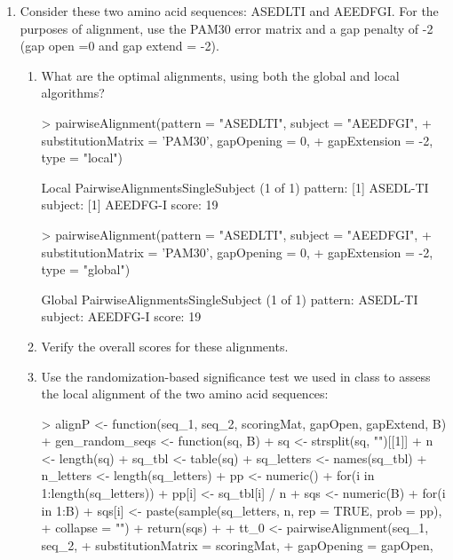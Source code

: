 \documentclass[12pt,a4paper]{paper}
\begin{document}
\begin{enumerate}
\begin{enumerate}
\end{enumerate}
\item Consider these two amino acid sequences: ASEDLTI and AEEDFGI. For the purposes of alignment, use the PAM30 error matrix and a gap penalty of -2 (gap open =0 and gap extend = -2).
\begin{enumerate}
\item What are the optimal alignments, using both the global and local algorithms?
\begin{Schunk}
\begin{Sinput}
> pairwiseAlignment(pattern = "ASEDLTI", subject = "AEEDFGI",
+                   substitutionMatrix = 'PAM30', gapOpening = 0, 
+                   gapExtension = -2, type = "local")
\end{Sinput}
\begin{Soutput}
Local PairwiseAlignmentsSingleSubject (1 of 1)
pattern: [1] ASEDL-TI
subject: [1] AEEDFG-I
score: 19 
\end{Soutput}
\begin{Sinput}
> pairwiseAlignment(pattern = "ASEDLTI", subject = "AEEDFGI",
+                   substitutionMatrix = 'PAM30', gapOpening = 0, 
+                   gapExtension = -2, type = "global")
\end{Sinput}
\begin{Soutput}
Global PairwiseAlignmentsSingleSubject (1 of 1)
pattern: ASEDL-TI
subject: AEEDFG-I
score: 19 
\end{Soutput}
\end{Schunk}
\item Verify the overall scores for these alignments.
\item Use the randomization-based significance test we used in class to assess the local alignment of the two amino acid sequences:
\begin{Schunk}
\begin{Sinput}
> alignP <- function(seq_1, seq_2, scoringMat, gapOpen, gapExtend, B) {
+   gen_random_seqs <- function(sq, B) {
+     sq <- strsplit(sq, "")[[1]]
+     n <- length(sq)
+     sq_tbl <- table(sq)
+     sq_letters <- names(sq_tbl)
+     n_letters <- length(sq_letters)
+     pp <- numeric()
+     for(i in 1:length(sq_letters)) 
+       pp[i] <- sq_tbl[i] / n
+     sqs <- numeric(B)
+     for(i in 1:B) 
+       sqs[i] <- paste(sample(sq_letters, n, rep = TRUE, prob = pp), 
+                       collapse = "")
+     return(sqs)
+   }    
+   tt_0 <- pairwiseAlignment(seq_1, seq_2, 
+                             substitutionMatrix = scoringMat, 
+                             gapOpening = gapOpen, 
}
\end{Sinput}
\end{Schunk}
\end{enumerate}
\end{enumerate}
\end{document}
